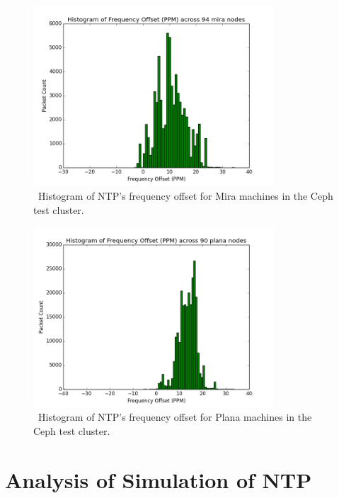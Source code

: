 \begin{figure}[h]
  \centering
  \caption{~Histogram of NTP's frequency offset for Mira machines in the Ceph test cluster.}
  \label{fig:mira-hist}
  \includegraphics[width=0.8\textwidth]{mira-freq-offset.png}
\end{figure}

\begin{figure}[h]
  \centering
  \caption{~Histogram of NTP's frequency offset for Plana machines in the Ceph test cluster.}
  \label{fig:plana-hist}
  \includegraphics[width=0.8\textwidth]{plana-freq-offset.png}
\end{figure}






        



\section{Analysis of Simulation of NTP}


